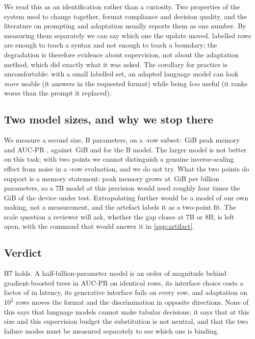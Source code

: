 We read this as an identification rather than a curiosity. Two properties of the
system used to change together, format compliance and decision quality, and the
literature on prompting and adaptation usually reports them as one number. By
measuring them separately we can say which one the update moved. \SftRows{}
labelled rows are enough to teach a syntax and not enough to teach a boundary; the
degradation is therefore evidence about supervision, not about the adaptation
method, which did exactly what it was asked. The corollary for practice is
uncomfortable: with a small labelled set, an adapted language model can look
\emph{more} usable (it answers in the requested format) while being \emph{less}
useful (it ranks worse than the prompt it replaced).

\subsection{Two model sizes, and why we stop there}\label{sec:scale}

We measure a second size, \LargeParams{}B parameters, on a \ScaleRows-row subset:
\LargeVram\,GiB peak memory and AUC-PR \LargeAucPr, against \SmallVram\,GiB and
\SmallAucPr{} for the \SmallParams{}B model. The larger model is not better on this
task; with two points we cannot distinguish a genuine inverse-scaling effect from
noise in a \ScaleRows-row evaluation, and we do not try. What the two points do support
is a memory statement: peak memory grows at \ScaleSlope\,GiB per billion
parameters, so a $7$B model at this precision would need roughly four times the
\GpuMemGiB\,GiB of the device under test. Extrapolating further would be a model of
our own making, not a measurement, and the artefact labels it as a two-point fit.
The scale question a reviewer will ask, whether the gap closes at $7$B or $8$B,
is left open, with the command that would answer it in \ref{app:artifact}.

\subsection{Verdict}

H7 holds. A half-billion-parameter model is an order of magnitude behind
gradient-boosted trees in AUC-PR on identical rows, its interface choice costs a
factor of \InterfaceRatio{} in latency, its generative interface fails on every
row, and adaptation on $10^2$ rows moves the format and the discrimination in
opposite directions. None of this says that language models cannot make tabular
decisions; it says that at this size and this supervision budget the substitution
is not neutral, and that the two failure modes must be measured separately to see
which one is binding.
